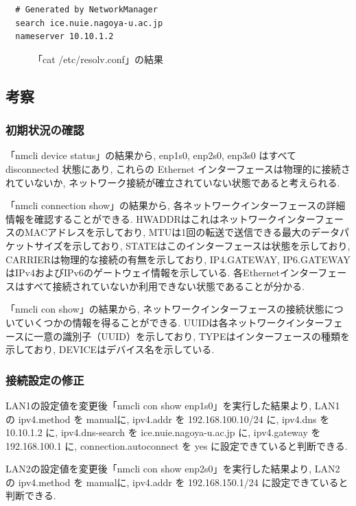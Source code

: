 \documentclass{ltjsarticle} %
\begin{document}
\begin{mdframed}
  \begin{verbatim}
  # Generated by NetworkManager
  search ice.nuie.nagoya-u.ac.jp
  nameserver 10.10.1.2
  \end{verbatim}
  \end{mdframed}
  \begin{figure}[H]
  \caption{「cat /etc/resolv.conf」の結果}
  \label{fig:resolv}
\end{figure}

\subsection{考察}

\subsubsection{初期状況の確認}
「nmcli device status」の結果から, enp1s0, enp2s0, enp3s0 はすべて disconnected 状態にあり, 
これらの Ethernet インターフェースは物理的に接続されていないか, ネットワーク接続が確立されていない状態であると考えられる. 

「nmcli connection show」の結果から, 各ネットワークインターフェースの詳細情報を確認することができる. 
HWADDRはこれはネットワークインターフェースのMACアドレスを示しており, 
MTUは1回の転送で送信できる最大のデータパケットサイズを示しており, 
STATEはこのインターフェースは状態を示しており, 
CARRIERは物理的な接続の有無を示しており, 
IP4.GATEWAY, IP6.GATEWAYはIPv4およびIPv6のゲートウェイ情報を示している. 
各Ethernetインターフェースはすべて接続されていないか利用できない状態であることが分かる. 

「nmcli con show」の結果から, ネットワークインターフェースの接続状態についていくつかの情報を得ることができる. 
UUIDは各ネットワークインターフェースに一意の識別子（UUID）を示しており, 
TYPEはインターフェースの種類を示しており, DEVICEはデバイス名を示している. 

\subsubsection{接続設定の修正}
LAN1の設定値を変更後「nmcli con show enp1s0」を実行した結果より, LAN1 の ipv4.method を manualに, 
ipv4.addr を 192.168.100.10/24 に,  ipv4.dns を 10.10.1.2 に,  ipv4.dns-search を 
ice.nuie.nagoya-u.ac.jp に, ipv4.gateway を 192.168.100.1 に, 
connection.autoconnect を yes に設定できていると判断できる. 

LAN2の設定値を変更後「nmcli con show enp2s0」を実行した結果より, LAN2 の ipv4.method を manualに, 
ipv4.addr を 192.168.150.1/24 に設定できていると判断できる. 
\end{document}
